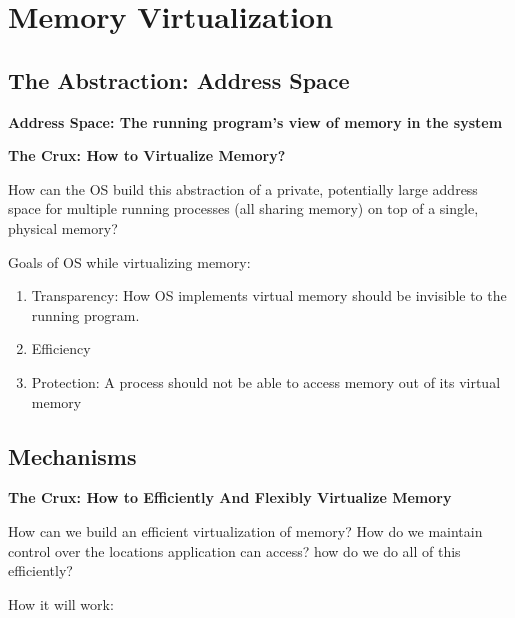 \chapter{Memory Virtualization}

\section{The Abstraction: Address Space}

\textbf{Address Space: The running program's view of memory in the system}\\

\begin{tcolorbox}
    \begin{center}
        \textbf{The Crux: How to Virtualize Memory?}
    \end{center}

    How can the OS build this abstraction of a private, potentially large
    address space for multiple running processes (all sharing memory) on 
    top of a single, physical memory?
\end{tcolorbox}

Goals of OS while virtualizing memory:

\begin{enumerate}
    \item Transparency: How OS implements virtual memory should be invisible
        to the running program.
    \item Efficiency
    \item Protection: A process should not be able to access memory out of
        its virtual memory
\end{enumerate}

\section{Mechanisms}

\begin{tcolorbox}
    \begin{center}
        \textbf{The Crux: How to Efficiently And Flexibly Virtualize Memory}
    \end{center}

    How can we build an efficient virtualization of memory? How do we maintain
    control over the locations application can access? how do we do all of
    this efficiently?
\end{tcolorbox}

How it will work:

